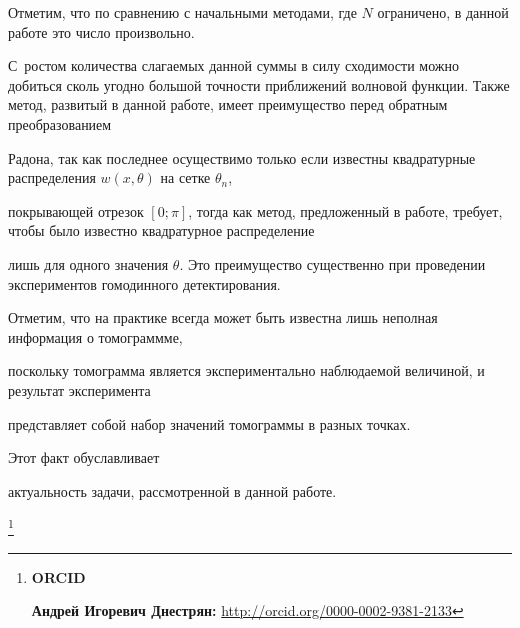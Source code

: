  Отметим, что по сравнению с начальными методами, где $N$ ограничено, в данной работе это число произвольно. 

С~ростом количества слагаемых данной суммы в силу сходимости можно добиться сколь угодно  большой точности приближений волновой функции. Также метод, развитый в данной работе, имеет преимущество перед обратным преобразованием

Радона, так как последнее осуществимо только если известны квадратурные распределения $w(x,\theta)$ на сетке $\theta_n$,

покрывающей отрезок $[0;\pi]$, тогда как метод, предложенный в работе, требует, чтобы было известно квадратурное распределение

 лишь для одного значения $\theta$. Это преимущество существенно при проведении экспериментов гомодинного детектирования. 



Отметим, что на практике всегда может быть известна лишь неполная информация о томограммме, 

поскольку томограмма является экспериментально наблюдаемой величиной, и результат эксперимента 

представляет собой набор значений томограммы в разных точках. 

Этот факт обуславливает 

актуальность задачи, рассмотренной в данной работе.





\thanks{{\bf ORCID}



{\bf Андрей Игоревич Днестрян:} \url{http://orcid.org/0000-0002-9381-2133}



}



\newpage



\RusRef



